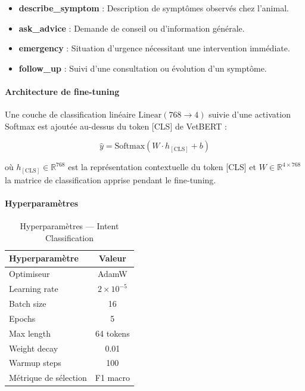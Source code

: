 \begin{itemize}
    \item \textbf{describe\_symptom} : Description de symptômes observés chez l'animal.
    \item \textbf{ask\_advice} : Demande de conseil ou d'information générale.
    \item \textbf{emergency} : Situation d'urgence nécessitant une intervention immédiate.
    \item \textbf{follow\_up} : Suivi d'une consultation ou évolution d'un symptôme.
\end{itemize}

\paragraph{Architecture de fine-tuning}

Une couche de classification linéaire $\text{Linear}(768 \rightarrow 4)$ suivie d'une activation Softmax est ajoutée au-dessus du token [CLS] de VetBERT :

\begin{equation}
\hat{y} = \text{Softmax}(W \cdot h_{[\text{CLS}]} + b)
\end{equation}

où $h_{[\text{CLS}]} \in \mathbb{R}^{768}$ est la représentation contextuelle du token [CLS] et $W \in \mathbb{R}^{4 \times 768}$ la matrice de classification apprise pendant le fine-tuning.

\paragraph{Hyperparamètres}

\begin{table}[H]
\centering
\caption{Hyperparamètres — Intent Classification}
\label{tab:intent-hp}
\renewcommand{\arraystretch}{1.4}
\begin{tabular}{|l|c|}
\hline
\textbf{Hyperparamètre} & \textbf{Valeur} \\
\hline
Optimiseur            & AdamW \\
Learning rate         & $2 \times 10^{-5}$ \\
Batch size            & 16 \\
Epochs                & 5 \\
Max length            & 64 tokens \\
Weight decay          & 0.01 \\
Warmup steps          & 100 \\
Métrique de sélection & F1 macro \\
\hline
\end{tabular}
\end{table}


